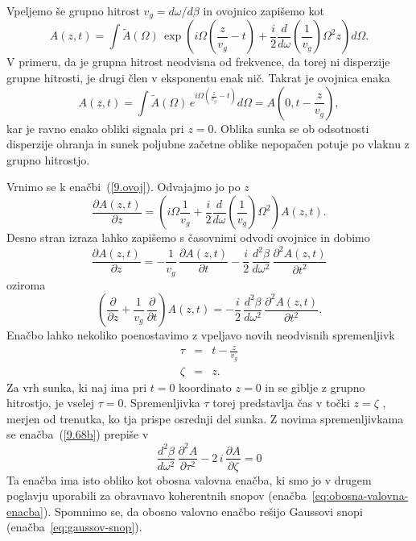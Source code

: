 Vpeljemo še grupno hitrost $v_g = d\omega/d\beta$ in ovojnico zapišemo kot
\begin{equation}
 A(z,t) = \int \tilde{A}(\Omega)\, \exp \left(i \Omega \left(\frac{z}{v_g}-t\right)+ 
 \frac{i}{2}\frac{d}{d\omega}
 \left(\frac{1}{v_g}\right)\Omega^2 z\right) d\Omega.
 \label{9.ovoj}
\end{equation}
V primeru, da je grupna hitrost neodvisna od frekvence, da torej ni disperzije grupne hitrosti, 
je drugi člen v eksponentu enak nič. Takrat je ovojnica enaka 
\begin{equation}
  A(z,t) = \int \tilde{A}(\Omega)\, e^{i \Omega \left(\frac{z}{v_g}-t\right)} d\Omega =
  A\left(0,t-\frac{z}{v_g}\right),
\end{equation}
kar je ravno enako obliki signala pri $z = 0$. Oblika sunka se ob odsotnosti 
disperzije ohranja in sunek 
poljubne začetne oblike nepopačen potuje po vlaknu z grupno hitrostjo. 

Vrnimo se k enačbi~(\ref{9.ovoj}). Odvajajmo jo po $z$ 
\begin{equation}
 \frac{\partial A(z,t)}{\partial z} = \left( i\Omega \frac{1}{v_g}+ \frac{i}{2}
\frac{d}{d\omega} \left(\frac{1}{v_g}\right) \Omega^2 \right) A(z,t).
\label{9.67}
\end{equation}
Desno stran izraza lahko zapišemo s časovnimi odvodi ovojnice in dobimo 
\begin{equation}
\frac{\partial A(z,t)}{\partial z} = -\frac{1}{v_{g}}\,\frac{\partial A (z,t)}{\partial t}
-\frac{i}{2}\,\frac{d^{2}\beta}{d\omega^{2}}\,\frac{\partial^{2}A\left(z,t\right)}{\partial t^{2}}
\label{9.68} 
\end{equation}
oziroma
\begin{equation}
\left(\frac{\partial}{\partial z} + \frac{1}{v_{g}}\,\frac{\partial }{\partial t}\right)A (z,t) = 
-\frac{i}{2}\,\frac{d^{2}\beta}{d\omega^{2}}\,\frac{\partial^{2}A\left(z,t\right)}{\partial t^{2}}.
\label{9.68b} 
\end{equation}
Enačbo lahko nekoliko poenostavimo z vpeljavo novih neodvisnih spremenljivk
\begin{eqnarray}
\tau & = & t-\frac{z}{v_{g}}\nonumber \\
\zeta & = & z.
\label{9.70}
\end{eqnarray}
Za vrh sunka, ki naj ima pri $t=0$ koordinato $z=0$ in se giblje
z grupno hitrostjo, je vselej $\tau=0$. Spremenljivka $\tau$ torej predstavlja
čas v točki $z=\zeta$ , merjen od trenutka, ko tja
prispe osrednji del sunka. Z novima spremenljivkama se enačba~(\ref{9.68b})
prepiše v 
\begin{equation}
\frac{d^{2}\beta}{d\omega^{2}}\,\frac{\partial^{2}A}{\partial\tau^{2}}-
2\, i\,\frac{\partial A}{\partial\zeta}=0
\label{9.71}
\end{equation}
Ta enačba ima isto obliko kot obosna valovna enačba, ki smo jo v
drugem poglavju uporabili za obravnavo koherentnih 
snopov (enačba~\ref{eq:obosna-valovna-enacba}). Spomnimo se, da 
obosno valovno enačbo rešijo Gaussovi snopi (enačba~\ref{eq:gaussov-snop}). 

